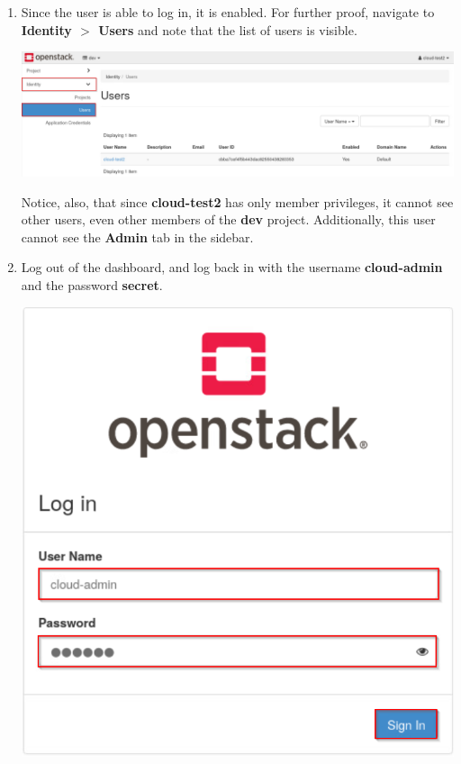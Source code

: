 \documentclass[letterpaper, 12pt]{article}
\begin{document}
\begin{enumerate}
    \item Since the user is able to log in, it is enabled.
    For further proof, navigate to \textbf{Identity $>$ Users} and note that the list of users is visible.

    \begin{center}
        \includegraphics[width=\linewidth]{images/part3/step11.png}
    \end{center}

    \begin{notebox}
        Notice, also, that since \textbf{cloud-test2} has only member privileges, it cannot see other users, even other members of the \textbf{dev} project.
        Additionally, this user cannot see the \textbf{Admin} tab in the sidebar.
    \end{notebox}

    \item Log out of the dashboard, and log back in with the username \textbf{cloud-admin} and the password \textbf{secret}.

    \begin{center}
        \includegraphics[scale=0.5]{images/part3/step12.png}
    \end{center}


\end{enumerate}
\end{document}
